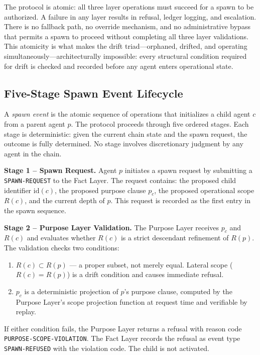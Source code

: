 The protocol is atomic: all three layer operations must succeed for a spawn to be authorized. A failure in any layer results in refusal, ledger logging, and escalation. There is no fallback path, no override mechanism, and no administrative bypass that permits a spawn to proceed without completing all three layer validations. This atomicity is what makes the drift triad---orphaned, drifted, and operating simultaneously---architecturally impossible: every structural condition required for drift is checked and recorded before any agent enters operational state.

\subsection{Five-Stage Spawn Event Lifecycle}

A \emph{spawn event} is the atomic sequence of operations that initializes a child agent $c$ from a parent agent $p$. The protocol proceeds through five ordered stages. Each stage is deterministic: given the current chain state and the spawn request, the outcome is fully determined. No stage involves discretionary judgment by any agent in the chain.

\bigskip
\noindent\textbf{Stage 1 -- Spawn Request.} Agent $p$ initiates a spawn request by submitting a \texttt{SPAWN-REQUEST} to the Fact Layer. The request contains: the proposed child identifier $\mathrm{id}(c)$, the proposed purpose clause $p_c$, the proposed operational scope $R(c)$, and the current depth of $p$. This request is recorded as the first entry in the spawn sequence.

\bigskip
\noindent\textbf{Stage 2 -- Purpose Layer Validation.} The Purpose Layer receives $p_c$ and $R(c)$ and evaluates whether $R(c)$ is a strict descendant refinement of $R(p)$. The validation checks two conditions:

\begin{enumerate}
  \item[(PL-V1)] $R(c) \subset R(p)$ --- a proper subset, not merely equal. Lateral scope ($R(c) = R(p)$) is a drift condition and causes immediate refusal.
  \item[(PL-V2)] $p_c$ is a deterministic projection of $p$'s purpose clause, computed by the Purpose Layer's scope projection function at request time and verifiable by replay.
\end{enumerate}

If either condition fails, the Purpose Layer returns a refusal with reason code \texttt{PURPOSE-SCOPE-VIOLATION}. The Fact Layer records the refusal as event type \texttt{SPAWN-REFUSED} with the violation code. The child is not activated.

